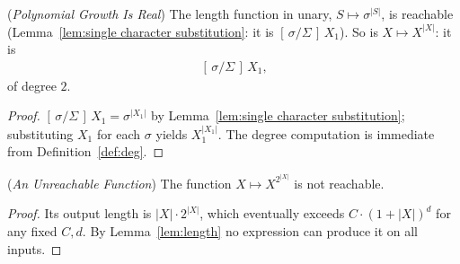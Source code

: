 \documentclass[runningheads,envcountsect]{llncs}
\begin{document}
\begin{proposition}
    (\emph{Polynomial Growth Is Real})
    The length function in unary, $S \mapsto \sigma^{|S|}$, is reachable (Lemma~\ref{lem:single character substitution}: it is $[\,\sigma/\Sigma\,]\,X_1$). So is $X \mapsto X^{|X|}$: it is
    \begin{align}
        [\,X_1/\sigma\,]\,[\,\sigma/\Sigma\,]\,X_1,
    \end{align}
    of degree $2$.
\end{proposition}

\begin{proof}
    $[\,\sigma/\Sigma\,]\,X_1 = \sigma^{|X_1|}$ by Lemma~\ref{lem:single character substitution}; substituting $X_1$ for each $\sigma$ yields $X_1^{|X_1|}$. The degree computation is immediate from Definition~\ref{def:deg}.
\end{proof}

\begin{theorem}
    (\emph{An Unreachable Function})
    The function $X \mapsto X^{2^{|X|}}$ is not reachable.
\end{theorem}

\begin{proof}
    Its output length is $|X| \cdot 2^{|X|}$, which eventually exceeds $C \cdot (1+|X|)^d$ for any fixed $C, d$. By Lemma~\ref{lem:length} no expression can produce it on all inputs.
\end{proof}
\end{document}

